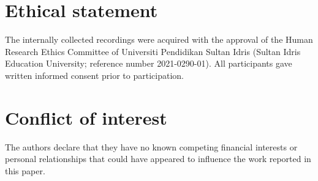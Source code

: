 \documentclass{iopjournal}
\begin{document}

\section*{Ethical statement}
The internally collected recordings were acquired with the approval of
the Human Research Ethics Committee of Universiti Pendidikan Sultan Idris (Sultan Idris Education University; reference number 2021-0290-01). All participants gave written informed
consent prior to participation.

\section*{Conflict of interest}
The authors declare that they have no known competing financial interests or
personal relationships that could have appeared to influence the work reported
in this paper.

\appendix




\end{document}
